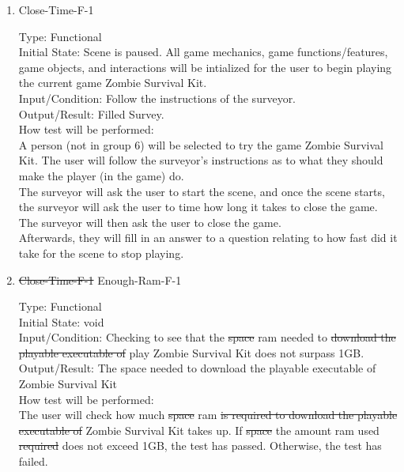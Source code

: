 \documentclass[12pt, titlepage]{article}
\newcounter{ftnum}
\newcounter{nftnum}
\begin{document}
\begin{enumerate}
	\item{Close-Time-F-1\\}  \label{NF7}
	
	Type: Functional \\
	
	Initial State: Scene is paused. All game mechanics, game functions/features, game objects, and interactions will be intialized for the user to begin playing the current game Zombie Survival Kit. \\
	
	Input/Condition: Follow the instructions of the surveyor. \\
	
	Output/Result: Filled Survey. \\
	
	How test will be performed:\\ A person (not in group 6) will be selected to try the game Zombie Survival Kit. The user will follow the surveyor's instructions as to what they should make the player (in the game) do. \\
	The surveyor will ask the user to start the scene, and once the scene starts, the surveyor will ask the user to time how long it takes to close the game. The surveyor will then ask the user to close the game. \\
	Afterwards, they will fill in an answer to a question relating to how fast did it take for the scene to stop playing. \\
	
	\item{\sout{Close-Time-F-1} {\color{magenta} Enough-Ram-F-1}\\}  \label{NF8}
	
	Type: Functional \\
	
	Initial State: void \\
	
	Input/Condition: Checking to see that the \sout{space} {\color{magenta} ram} needed to \sout{download the playable executable of} {\color{magenta} play} Zombie Survival Kit does not surpass 1GB. \\
	
	Output/Result: The space needed to download the playable executable of Zombie Survival Kit \\
	
	How test will be performed:\\ The user will check how much \sout{space} {\color{magenta} ram} \sout{is required to download the playable executable of} Zombie Survival Kit {\color{magenta} takes up}. If \sout{space} {\color{magenta} the amount ram used} \sout{required} does not exceed 1GB, the test has passed. Otherwise, the test has failed. \\
	
\end{enumerate}
\end{document}
